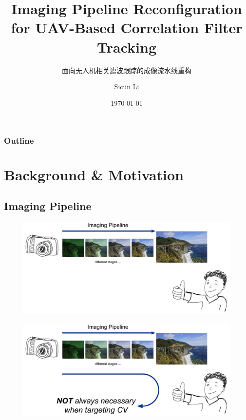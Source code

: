 \documentclass{beamer}
\author{Sicun Li}
\title{Imaging Pipeline Reconfiguration for UAV-Based Correlation Filter Tracking}
\subtitle{面向无人机相关滤波跟踪的成像流水线重构}
\institute{School of Microelectronics}
\date{\today}
\begin{document}
\begin{frame}
    \titlepage
\end{frame}

\begin{frame}
    \frametitle{Outline}
    \tableofcontents[sectionstyle=show,subsectionstyle=show/shaded/hide,subsubsectionstyle=show/shaded/hide]
\end{frame}

\section{Background \& Motivation}

\subsection{Imaging Pipeline}

\begin{frame}
    \begin{figure}[htpb]
        \begin{center}
            \includegraphics[width=1.0\linewidth]{fig/isp0.pdf}
        \end{center}
    \end{figure}
\end{frame}

\begin{frame}
    \begin{figure}[htpb]
        \begin{center}
            \includegraphics[width=1.0\linewidth]{fig/isp1.pdf}
        \end{center}
    \end{figure}
\end{frame}
\end{document}

